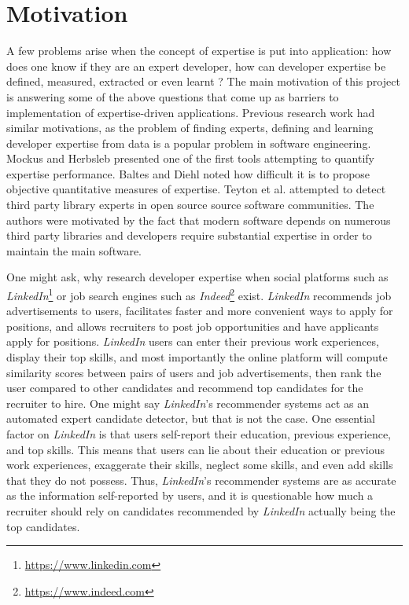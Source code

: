     \section{Motivation\label{sec:motivation}}
        A few problems arise when the concept of expertise is put into application: how does one know if they are an expert developer, how can developer expertise be defined, measured, extracted or even learnt ? The main motivation of this project is answering some of the above questions that come up as barriers to implementation of expertise-driven applications. Previous research work had similar motivations, as the problem of finding experts, defining and learning developer expertise from data is a popular problem in software engineering. Mockus and Herbsleb \cite{mockus2002expertise} presented one of the first tools attempting to quantify expertise performance. Baltes and Diehl \cite{baltes2018towards} noted how difficult it is to propose objective quantitative measures of expertise. Teyton et al. \cite{teyton2013find} attempted to detect third party library experts in open source source software communities. The authors were motivated by the fact that modern software depends on numerous third party libraries and developers require substantial expertise in order to maintain the main software.
        
        One might ask, why research developer expertise when social platforms such as \emph{LinkedIn}\footnote{\url{https://www.linkedin.com}} or job search engines such as \emph{Indeed}\footnote{\url{https://www.indeed.com}} exist. \emph{LinkedIn} recommends job advertisements to users, facilitates faster and more convenient ways to apply for positions, and allows recruiters to post job opportunities and have applicants apply for positions. \emph{LinkedIn} users can enter their previous work experiences, display their top skills, and most importantly the online platform will compute similarity scores between pairs of users and job advertisements, then rank the user compared to other candidates and recommend top candidates for the recruiter to hire. One might say \emph{LinkedIn}'s recommender systems act as an automated expert candidate detector, but that is not the case. One essential factor on \emph{LinkedIn} is that users self-report their education, previous experience, and top skills. This means that users can lie about their education or previous work experiences, exaggerate their skills, neglect some skills, and even add skills that they do not possess. Thus, \emph{LinkedIn}'s recommender systems are as accurate as the information self-reported by users, and it is questionable how much a recruiter should rely on candidates recommended by \emph{LinkedIn} actually being the top candidates.
        
